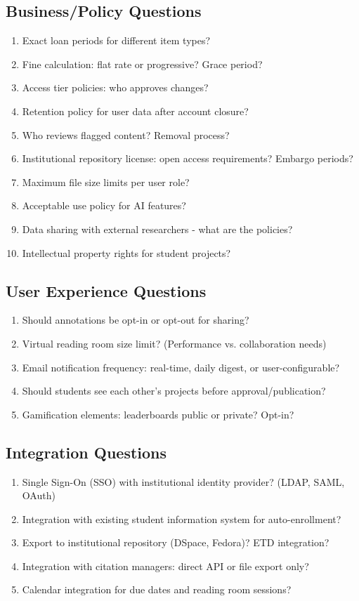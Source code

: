 \documentclass[12pt,a4paper]{report}
\begin{document}
\subsection{Business/Policy Questions}
\begin{enumerate}
    \item Exact loan periods for different item types?
    \item Fine calculation: flat rate or progressive? Grace period?
    \item Access tier policies: who approves changes?
    \item Retention policy for user data after account closure?
    \item Who reviews flagged content? Removal process?
    \item Institutional repository license: open access requirements? Embargo periods?
    \item Maximum file size limits per user role?
    \item Acceptable use policy for AI features?
    \item Data sharing with external researchers - what are the policies?
    \item Intellectual property rights for student projects?
\end{enumerate}

\subsection{User Experience Questions}
\begin{enumerate}
    \item Should annotations be opt-in or opt-out for sharing?
    \item Virtual reading room size limit? (Performance vs. collaboration needs)
    \item Email notification frequency: real-time, daily digest, or user-configurable?
    \item Should students see each other's projects before approval/publication?
    \item Gamification elements: leaderboards public or private? Opt-in?
\end{enumerate}

\subsection{Integration Questions}
\begin{enumerate}
    \item Single Sign-On (SSO) with institutional identity provider? (LDAP, SAML, OAuth)
    \item Integration with existing student information system for auto-enrollment?
    \item Export to institutional repository (DSpace, Fedora)? ETD integration?
    \item Integration with citation managers: direct API or file export only?
    \item Calendar integration for due dates and reading room sessions?
\end{enumerate}
\end{document}

